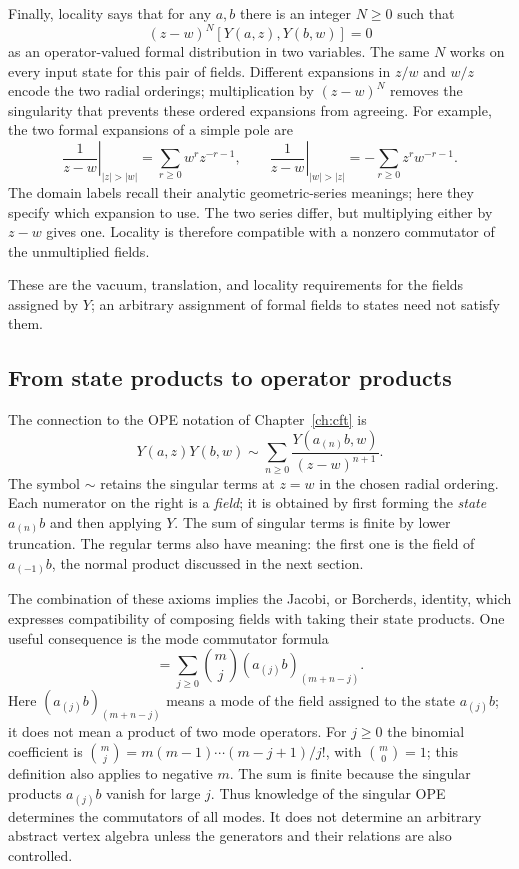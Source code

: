 Finally, locality says that for any $a,b$ there is an integer $N\geq0$
such that
\[
 (z-w)^N[Y(a,z),Y(b,w)]=0
\]
as an operator-valued formal distribution in two variables.
The same $N$ works on every input state for this pair of fields.
Different expansions in $z/w$ and $w/z$ encode the two radial
orderings; multiplication by $(z-w)^N$ removes the singularity
that prevents these ordered expansions from agreeing. For example,
the two formal expansions of a simple pole are
\[
 \left.\frac1{z-w}\right|_{|z|>|w|}
   =\sum_{r\geq0}w^rz^{-r-1},\qquad
 \left.\frac1{z-w}\right|_{|w|>|z|}
   =-\sum_{r\geq0}z^rw^{-r-1}.
\]
The domain labels recall their analytic geometric-series meanings;
here they specify which expansion to use. The two series differ,
but multiplying either by $z-w$ gives one. Locality is therefore
compatible with a nonzero commutator of the unmultiplied fields.

These are the vacuum, translation, and locality requirements for
the fields assigned by $Y$; an arbitrary assignment of formal
fields to states need not satisfy them.

\subsection{From state products to operator products}

The connection to the OPE notation of Chapter~\ref{ch:cft} is
\begin{equation}
 Y(a,z)Y(b,w)\sim\sum_{n\geq0}
       \frac{Y(a_{(n)}b,w)}{(z-w)^{n+1}}.
 \label{eq:voa-state-product-ope}
\end{equation}
The symbol $\sim$ retains the singular terms at $z=w$ in the
chosen radial ordering. Each numerator on the right is a
\emph{field}; it is obtained by first forming the \emph{state}
$a_{(n)}b$ and then applying $Y$. The sum of singular terms is
finite by lower truncation. The regular terms also have meaning:
the first one is the field of $a_{(-1)}b$, the normal product
discussed in the next section.

The combination of these axioms implies the Jacobi, or Borcherds,
identity, which expresses compatibility of composing fields with
taking their state products. One useful consequence is the mode
commutator formula
\begin{equation}
 [a_{(m)},b_{(n)}]
 =\sum_{j\ge0}\binom mj
          (a_{(j)}b)_{(m+n-j)}.
 \label{eq:voa-mode-commutator}
\end{equation}
Here $(a_{(j)}b)_{(m+n-j)}$ means a mode of the field assigned
to the state $a_{(j)}b$; it does not mean a product of two mode
operators. For $j\geq0$ the binomial coefficient is
$\binom mj=m(m-1)\cdots(m-j+1)/j!$, with $\binom m0=1$;
this definition also applies to negative $m$.
The sum is finite because the singular products $a_{(j)}b$ vanish
for large $j$. Thus knowledge of the singular OPE determines the
commutators of all modes. It does not determine an arbitrary abstract
vertex algebra unless the generators and their relations are also
controlled.

